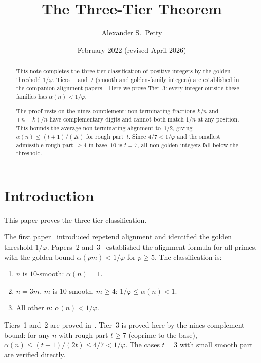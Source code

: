 \documentclass[12pt]{amsart}
\title{The Three-Tier Theorem}
\author{Alexander S.\ Petty}
\date{February 2022 (revised April 2026)}
\theoremstyle{definition}
\theoremstyle{remark}
\begin{document}
\begin{abstract}
This note completes the three-tier classification of
positive integers by the golden threshold $1/\varphi$.
Tiers~1 and~2 (smooth and golden-family integers) are
established in the companion alignment
papers~\cite{paper1,paper2}. Here we prove Tier~3:
every integer outside these families has
$\alpha(n) < 1/\varphi$.

The proof rests on the nines complement: non-terminating
fractions $k/n$ and $(n{-}k)/n$ have complementary digits
and cannot both match $1/n$ at any position. This bounds
the average non-terminating alignment to~$1/2$, giving
$\alpha(n) \le (t{+}1)/(2t)$ for rough part~$t$. Since
$4/7 < 1/\varphi$ and the smallest admissible rough part
$\ge 4$ in base~$10$ is $t = 7$, all non-golden integers
fall below the threshold.
\end{abstract}
\maketitle

\section{Introduction}

This paper proves the three-tier classification.

The first paper~\cite{paper1} introduced repetend
alignment and identified the golden threshold
$1/\varphi$. Papers~2 and~3~\cite{paper2,paper3}
established the alignment formula for all primes, with
the golden bound $\alpha(pm) < 1/\varphi$ for $p \ge 5$.
The classification is:

\begin{enumerate}
\item[\textbf{Tier~1.}] $n$ is $10$-smooth: $\alpha(n) = 1$.
\item[\textbf{Tier~2.}] $n = 3m$, $m$ is $10$-smooth, $m \ge 4$:
      $1/\varphi \le \alpha(n) < 1$.
\item[\textbf{Tier~3.}] All other $n$: $\alpha(n) < 1/\varphi$.
\end{enumerate}

Tiers~1 and~2 are proved in~\cite{paper1}. Tier~3 is
proved here by the nines complement bound: for any
$n$ with rough part $t \ge 7$ (coprime to the base),
$\alpha(n) \le (t{+}1)/(2t) \le 4/7 < 1/\varphi$.
The cases $t = 3$ with small smooth part are verified
directly.
\end{document}
